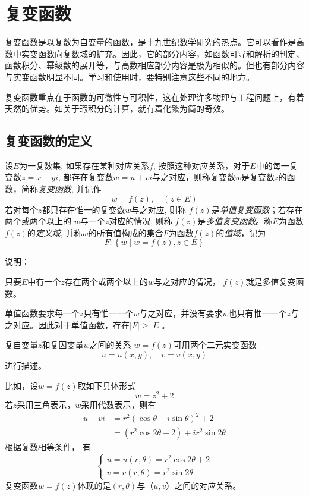 \section{复变函数} 
复变函数是以复数为自变量的函数，是十九世纪数学研究的热点。它可以看作是高数中实变函数向复数域的扩充。因此，它的部分内容，如函数可导和解析的判定、函数积分、幂级数的展开等，与高数相应部分内容是极为相似的。但也有部分内容与实变函数明显不同。学习和使用时，要特别注意这些不同的地方。

复变函数重点在于函数的可微性与可积性，这在处理许多物理与工程问题上，有着天然的优势。如关于瑕积分的计算，就有着化繁为简的奇效。

\subsection{复变函数的定义}

\begin{definition}\label{}\index{}
	设$E$为一复数集, 如果存在某种对应关系$f$, 按照这种对应关系，对于$E$中的每一复变数$z= x+yi$, 都存在复变数$w = u+vi $与之对应，则称复变数$w$是复变数$z$的函数，简称\emph{复变函数}, 并记作 $$w = f (z ), \quad (z \in E)$$ 
	若对每个$z$都只存在惟一的复变数$w$与之对应, 则称 $f (z )$是\emph{单值复变函数}；若存在两个或两个以上的 $w$与一个$z$对应的情况, 则称 $f (z )$是\emph{多值复变函数}。称$E$为函数$f ( z )$的\emph{定义域}, 并称$w$的所有值构成的集合$F$为函数$f ( z )$的\emph{值域}，记为
    \[F: \left\{ w \mid w=f(z), z \in E \right\} \]
\end{definition}
说明：\begin{compactitem}
    \item 只要$E$中有一个$z$存在两个或两个以上的$w$与之对应的情况， $f (z )$就是多值复变函数。
    \item 单值函数要求每一个$z$只有惟一一个$w$与之对应，并没有要求$w$也只有惟一一个$z$与之对应。因此对于单值函数，存在$|F| \ge |E| $。
    \item 复自变量$z$和复因变量$w$之间的关系 $w = f (z )$可用两个二元实变函数
    \[ u =u(x,y), \quad  v =v(x,y)\]
    进行描述。
\end{compactitem}
比如，设$ w = f(z)$取如下具体形式 
\[ w = z^2 +2\]
若$z$采用三角表示，$w$采用代数表示，则有
   \[ \begin{aligned}
	 u+vi &=  r^2 (\cos \theta +i\sin \theta )^2 +2 \\ 
	 &= (r^2 \cos 2 \theta +2) + i r^2 \sin 2 \theta 
   \end{aligned}\] 
根据复数相等条件， 有
   \[ \begin{cases}
	 u = u(r,\theta) = r^2 \cos 2 \theta +2\\
	 v = v(r,\theta) =  r^2 \sin 2 \theta
 \end{cases}\]
 复变函数$w = f (z )$体现的是$(r, \theta)$与（$u,v$）之间的对应关系。\\

